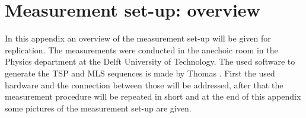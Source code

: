 \chapter{Measurement set-up: overview}
\label{app:setupoverview}

In this appendix an overview of the measurement set-up will be given for replication.
The measurements were conducted in the anechoic room in the Physics department at the Delft University of Technology.
The used software to generate the TSP and MLS sequences is made by Thomas \cite{Thomas2006}.
First the used hardware and the connection between those will be addressed, after that the measurement procedure will be repeated in short and at the end of this appendix some pictures of the measurement set-up are given.

